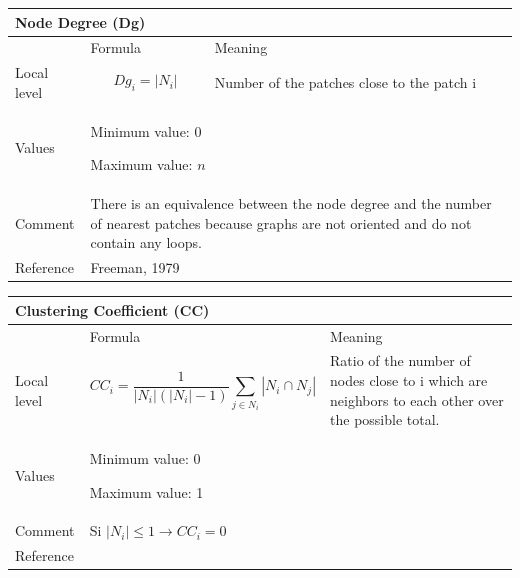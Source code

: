 \documentclass{article}
\begin{document}
\begin{table}[H]
\begin{tabular}{|m{3.24cm}|m{4.4810004cm}m{7.924cm}|}
\hline
\multicolumn{3}{|m{16.044998cm}|}{Node Degree (Dg)}\\\hline
 &
\multicolumn{1}{m{4.4810004cm}|}{Formula} &
Meaning\\\hline
Local level

 &
\multicolumn{1}{m{4.4810004cm}|}{\begin{equation*}
{\mathit{Dg}}_{i}=\left|{N}_{i}\right|
\end{equation*}
} &
Number of the patches close to the patch i\\\hline
Values &
\multicolumn{2}{m{12.6050005cm}|}{Minimum value: 0

Maximum value:  $n$

}\\\hline
Comment &
\multicolumn{2}{m{12.6050005cm}|}{There is an equivalence between the
node degree and the number of nearest patches because graphs are not
oriented and do not contain any loops.

}\\\hline
Reference &
\multicolumn{2}{m{12.6050005cm}|}{Freeman, 1979}\\\hline
\end{tabular}
\end{table}


\begin{table}[H]
\begin{tabular}{|m{3.24cm}|m{5.303cm}m{7.103cm}|}
\hline
\multicolumn{3}{|m{16.046cm}|}{Clustering Coefficient (CC)}\\\hline
 &
\multicolumn{1}{m{5.303cm}|}{Formula} &
Meaning\\\hline
Local level

 &
\multicolumn{1}{m{5.303cm}|}{\begin{equation*}
{\mathit{CC}}_{i}=\frac{1}{\left|{N}_{i}\right|\left(\left|{N}_{i}\right|-1\right)}\sum
_{j{\in}{N}_{i}}{\left|{N}_{i}{\cap}{N}_{j}\right|}
\end{equation*}
} &
Ratio of the number of nodes close to i which are neighbors to each
other over the possible total. \\\hline
Values &
\multicolumn{2}{m{12.606cm}|}{Minimum value: 0

Maximum value: 1

}\\\hline
Comment &
\multicolumn{2}{m{12.606cm}|}{Si 
$\left|{N}_{i}\right|{\leq}1\rightarrow {\mathit{CC}}_{i}=0$ }\\\hline
Reference &
\multicolumn{2}{m{12.606cm}|}{\cite{Ricotta2000}}\\\hline
\end{tabular}
\end{table}
\end{document}
